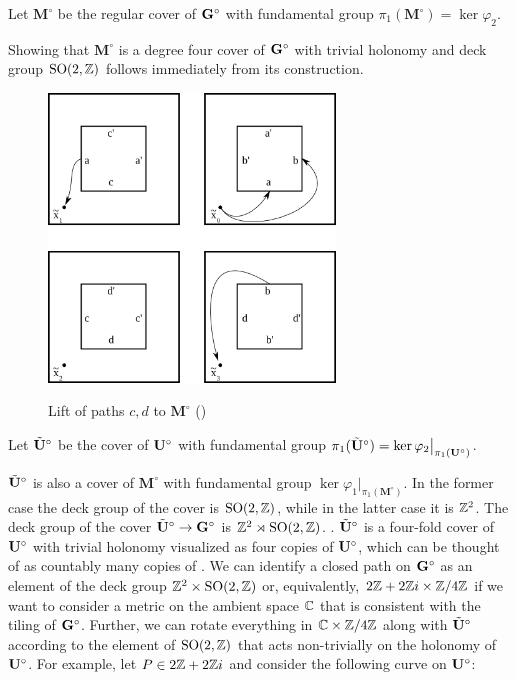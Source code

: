 \documentclass[]{article}
\def\bMs{\mathbf{M}^\circ}
\def\btUs{\btU^\circ}
\def\SO{\mathrm{SO}}
\begin{document}
\begin{Def}
Let $\bMs$ be the regular cover of $\mathbf{G}^\circ$ with fundamental group $\pi_1(\bMs)=\ker\varphi_2$.
\end{Def}
Showing that $\bMs$ is a degree four cover of $\mathbf{G}^\circ$ with trivial holonomy and deck group $\SO(2,\ZZ)$ follows immediately from its construction.
\begin{figure}[H]
\centering
\includegraphics[width=3in]{monogroup.png}
\label{fig:arbitrarylift}
\caption{Lift of paths $c,d$ to $\bMs$ ()}
\end{figure}

\begin{Def}
Let $\btUs$ be the cover of $\mathbf{U}^\circ$ with fundamental group $\pi_1(\btUs)=\ker\varphi_2\big\vert_{\pi_1(\bUs)}$.
\end{Def}

\compav{Prove that $\ker\varphi_1\big\vert_{\pi_1(\bMs)}=\ker\varphi_2\big\vert_{\pi_1(\bUs)}$}

$\btUs$ is also a cover of $\bMs$ with fundamental group $\ker\varphi_1\big\vert_{\pi_1(\bMs)}$. In the former case the deck group of the cover is $\SO(2,\ZZ)$, while in the latter case it is $\mathbb{Z}^2$. The deck group of the cover $\btUs\rightarrow\bGs$ is $\ZZ^2\rtimes\SO(2,\ZZ)$. . $\btUs$ is a four-fold cover of $\mathbf{U}^\circ$ with trivial holonomy visualized as four copies of $\mathbf{U}^\circ$, which can be thought of as countably many copies of . We can identify a closed path on $\mathbf{G}^\circ$ as an element of the deck group $\ZZ^2\times \SO(2,\ZZ)$ or, equivalently, $ 2\mathbb{Z}+2\mathbb{Z} i\times \mathbb{Z}/4\mathbb{Z}$ if we want to consider a metric on the ambient space $\mathbb{C}$ that is consistent with the tiling of $\mathbf{G}^\circ$. Further, we can rotate everything in $\mathbb{C}\times \mathbb{Z}/4\mathbb{Z}$ along with $\btUs$ according to the element of $\SO(2,\ZZ)$ that acts non-trivially on the holonomy of $\mathbf{U}^\circ$. For example, let $P\in2\mathbb{Z}+2\mathbb{Z} i$ and consider the following curve on $\mathbf{U}^\circ$:
\end{document}
